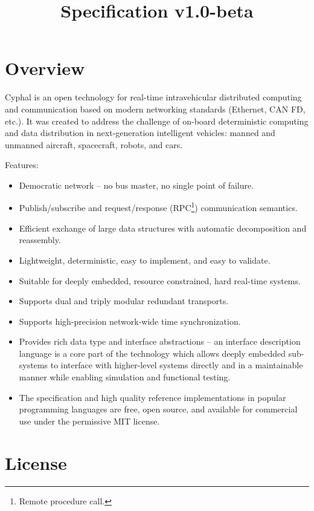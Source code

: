\documentclass{cyphaldoc}
\title{Specification v1.0-beta}
\begin{document}
\frontmatter

\begin{titlepage}

\section*{Overview}

Cyphal is an open technology for real-time intravehicular distributed computing and communication based on
modern networking standards (Ethernet, CAN FD, etc.).
It was created to address the challenge of on-board deterministic computing and data distribution in
next-generation intelligent vehicles: manned and unmanned aircraft, spacecraft, robots, and cars.

Features:

\begin{itemize}
    \item Democratic network -- no bus master, no single point of failure.
    \item Publish/subscribe and request/response (RPC\footnote{Remote procedure call.}) com\-mu\-ni\-ca\-tion semantics.
    \item Efficient exchange of large data structures with automatic decomposition and reassembly.
    \item Lightweight, deterministic, easy to implement, and easy to validate.
    \item Suitable for deeply embedded, resource constrained, hard real-time systems.
    \item Supports dual and triply modular redundant transports.
    \item Supports high-precision network-wide time syn\-chro\-ni\-za\-tion.
    \item Provides rich data type and interface abstractions -- an interface description language is a core part of
    the technology which allows deeply embedded sub-systems to interface with higher-level systems directly and
    in a maintainable manner while enabling simulation and functional testing.
    \item The specification and high quality reference implementations in popular programming languages are free,
    open source, and available for commercial use under the permissive MIT license.
\end{itemize}

\BeginRightColumn

\section*{License}


\end{titlepage}
\end{document}
